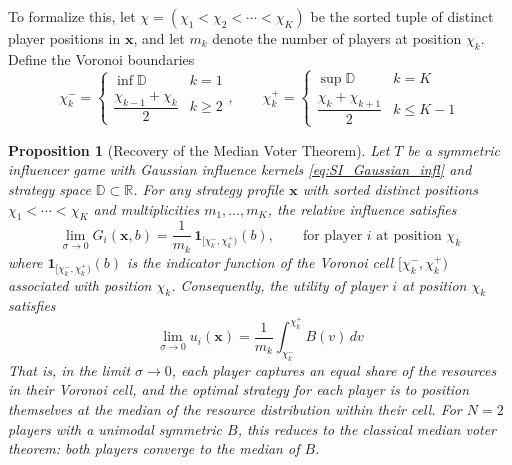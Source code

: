 \documentclass{article}
\newtheorem{proposition}[theorem]{Proposition}
\begin{document}
        To formalize this, let $\chi = (\chi_1 < \chi_2 < \cdots < \chi_K)$ be the sorted tuple of distinct player positions in $\mathbf{x}$, and let $m_k$ denote the number of players at position $\chi_k$.
        Define the Voronoi boundaries
        \begin{equation}
            \chi_k^- =
            \begin{cases}
                \inf\mathbb{D} & k = 1 \\
                \dfrac{\chi_{k-1} + \chi_k}{2} & k \geq 2
            \end{cases},
            \qquad
            \chi_k^+ =
            \begin{cases}
                \sup\mathbb{D} & k = K \\
                \dfrac{\chi_k + \chi_{k+1}}{2} & k \leq K-1
            \end{cases}
        \end{equation}
        \begin{proposition}[Recovery of the Median Voter Theorem]
        \label{prop:SI_median_voter}
            Let $T$ be a symmetric influencer game with Gaussian influence kernels \cref{eq:SI_Gaussian_infl} and strategy space $\mathbb{D} \subset \mathbb{R}$.
            For any strategy profile $\mathbf{x}$ with sorted distinct positions $\chi_1 < \cdots < \chi_K$ and multiplicities $m_1,\ldots,m_K$, the relative influence satisfies
            \begin{equation}
                \label{eq:SI_median_voter_limit}
                \lim_{\sigma \to 0} G_i(\mathbf{x}, b)
                = \frac{1}{m_k}\,\mathbf{1}_{[\chi_k^-, \chi_k^+)}(b),
                \qquad \text{for player } i \text{ at position } \chi_k
            \end{equation}
            where $\mathbf{1}_{[\chi_k^-, \chi_k^+)}(b)$ is the indicator function of the Voronoi cell $[\chi_k^-, \chi_k^+)$ associated with position $\chi_k$.
            Consequently, the utility of player $i$ at position $\chi_k$ satisfies
            \begin{equation}
                \label{eq:SI_median_voter_utility}
                \lim_{\sigma \to 0} u_i(\mathbf{x})
                = \frac{1}{m_k}\int_{\chi_k^-}^{\chi_k^+} B(v)\,dv
            \end{equation}
            That is, in the limit $\sigma \to 0$, each player captures an equal share of the resources in their Voronoi cell, and the optimal strategy for each player is to position themselves at the median of the resource distribution within their cell.
            For $N = 2$ players with a unimodal symmetric $B$, this reduces to the classical median voter theorem: both players converge to the median of $B$.
        \end{proposition}
\end{document}
